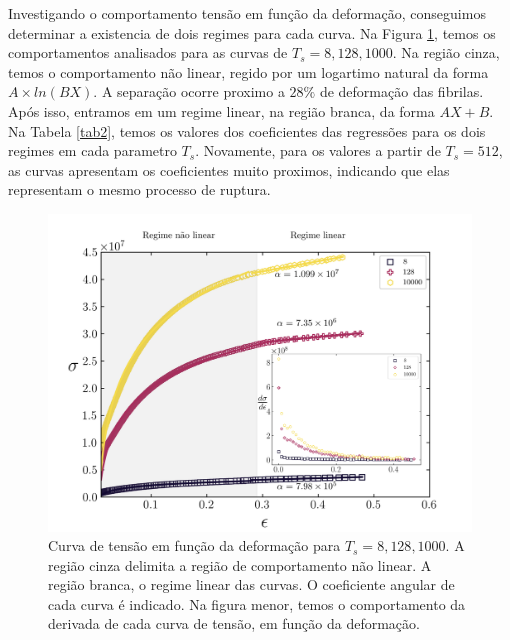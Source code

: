 \documentclass{article}
\begin{document}
    Investigando o comportamento tensão em função da deformação, conseguimos determinar a existencia de dois regimes 
    para cada curva. Na Figura \ref{R8}, temos os comportamentos analisados para as curvas de \(T_{s} = 8, 128, 1000\). 
    Na região cinza, temos o comportamento não linear, regido por um logartimo natural da forma \(A\times ln(BX)\).
    A separação ocorre proximo a \(28 \%\) de deformação das fibrilas. Após isso, entramos em um regime linear, na 
    região branca, da forma \(AX + B\). Na Tabela \ref{tab2}, temos os valores dos coeficientes das regressões para os
    dois regimes em cada parametro \(T_{s}\). Novamente, para os valores a partir de \(T_{s} = 512\), as curvas apresentam 
    os coeficientes muito proximos, indicando que elas representam o mesmo processo de ruptura.

    \begin{figure}[H]
        \centering
        \includegraphics[width=\textwidth]{figures/stress_fit.png}

        \caption{Curva de tensão em função da deformação para \(T_{s} = 8, 128, 1000\). A região cinza delimita a 
        região de comportamento não linear. A região branca, o regime linear das curvas. O coeficiente angular de cada 
        curva é indicado. Na figura menor, temos o comportamento da derivada de cada curva de tensão, em função da 
        deformação.} 

        \label{R8}
    \end{figure}
\end{document}
